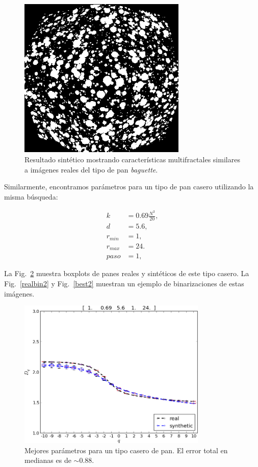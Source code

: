 \begin{figure}[!ht]
\begin{center}
\includegraphics[width=8cm]{figures/best}
\caption{Resultado sintético mostrando características multifractales similares a imágenes reales del tipo de pan {\em baguette}.}
\label{best}
\end{center}
\end{figure}

Similarmente, encontramos parámetros para un tipo de pan casero utilizando la misma búsqueda:

\begin{align*}
k &= 0.69 \frac{N^{3}}{20} ,\\
d &=5.6,\\
r_{min} &=1,\\
r_{max} &=24.\\
paso &=1,
\end{align*}

La Fig.~\ref{bestboxplot2} muestra boxplots de panes reales y sintéticos de este tipo casero.
La Fig.~\ref{realbin2} y  Fig.~\ref{best2} muestran un ejemplo de binarizaciones de estas imágenes. 


\begin{figure}[!ht]
\includegraphics[width=9cm]{figures/bestboxplot2}
\caption{Mejores parámetros para un tipo casero de pan. El error total en medianas es de $\sim 0.88$.}
\label{bestboxplot2}
\end{figure}

